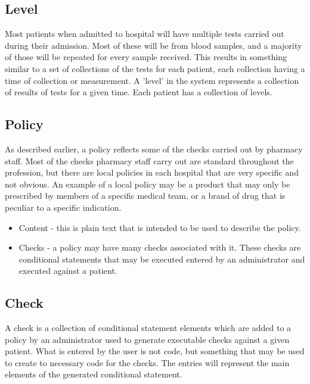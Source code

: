 \documentclass[letterpaper]{amsart}
\begin{document}
\subsection{Level}
Most patients when admitted to hospital will have multiple tests carried out during their admission.  Most of these will be from blood samples, and a majority of those will be repeated for every sample received.  This results in something similar to a set of collections of the tests for each patient, each collection having a time of collection or measurement.  A 'level' in the system represents a collection of results of tests for a given time.  Each patient has a collection of levels.
\subsection{Policy}
As described earlier, a policy reflects some of the checks carried out by pharmacy staff.  Most of the checks pharmacy staff carry out are standard throughout the profession, but there are local policies in each hospital that are very specific and not obvious.  An example of a local policy may be a product that may only be prescribed by members of a specific medical team, or a brand of drug that is peculiar to a specific indication.
\begin{itemize}
    \item Content - this is plain text that is intended to be used to describe the policy. 
    \item Checks - a policy may have many checks associated with it.  These checks are conditional statements that may be executed entered by an administrator and executed against a patient.
\end{itemize}
\subsection{Check}
A check is a collection of conditional statement elements which are added to a policy by an administrator used to generate executable checks against a given patient.  What is entered by the user is not code, but something that may be used to create to necessary code for the checks.  The entries will represent the main elements of the generated conditional statement.
\end{document}
